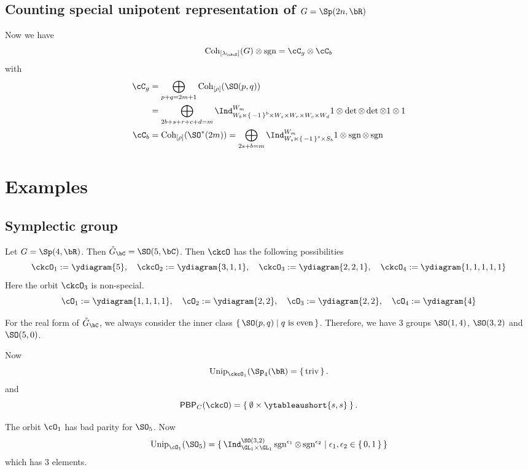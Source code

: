 \documentclass[12pt,a4paper]{amsart}
\let\ytb=\ytableaushort
\newcommand{\sgn}{\operatorname{sgn}}
\newcommand{\triv}{\operatorname{triv}}
\numberwithin{equation}{section}
\theoremstyle{remark}
\def\Unip{\mathrm{Unip}}
\def\ckG{\check{G}}
\def\lamck{\lambda_\ckcO}
\def\Cint#1{\Coh_{[#1]}}
\def\Coh{\mathrm{Coh}}
\begin{document}
\subsection{Counting special unipotent representation of $G = \Sp(2n,\bR)$}

Now we have 
\[
  \Cint{\lamck}(G) \otimes \sgn  = \cC_g\otimes \cC_b 
\]
with 
\[
  \begin{split}
 \cC_g &= \bigoplus_{p+q=2m+1}\Cint{\rho}(\SO(p,q))  \\
 &= 
 \bigoplus_{2b+s+r+c+d=m}\Ind_{W_b\ltimes \set{-1}^b\times W_s\times W_r\times W_c\times W_d}^{W_m} 1 \otimes \det \otimes \det \otimes 1 \otimes 1\\
 \cC_b &= \Cint{\rho}(\SO^*(2m)) = \bigoplus_{\substack{2s+b=m}}\Ind_{W_s\ltimes \set{-1}^s\times S_b}^{W_m} 1 \otimes\sgn\otimes \sgn   
  \end{split}
\]



\section{Examples}
\subsection{Symplectic group}
Let $G = \Sp(4,\bR)$. Then $\ckG_{\bC}= \SO(5,\bC)$.
Then $\ckcO$ has the following possibilities
\[
  \ckcO_{1}:= \ydiagram{5},\quad \ckcO_{2}:=\ydiagram{3,1,1}, \quad
  \ckcO_{3}:=\ydiagram{2,2,1}, \quad \ckcO_{4}:=\ydiagram{1,1,1,1,1}
\]
Here the orbit $\ckcO_{3}$ is non-special.
\[
  \cO_{1}:= \ydiagram{1,1,1,1},\quad \cO_{2}:=\ydiagram{2,2}, \quad
  \cO_{3}:=\ydiagram{2,2}, \quad \cO_{4}:=\ydiagram{4}
\]

For the real form of $\ckG_{\bC}$, we always consider the inner class
$\set{\SO(p,q)| q \text{ is even}}$.
Therefore, we have $3$ groups $\SO(1,4)$, $\SO(3,2)$ and $\SO(5,0)$.


Now
\[
  \Unip_{\ckcO_{1}}(\Sp_{4}(\bR) = \set{\triv}.
\]
and
\[
  \PBP_{C}(\ckcO) = \Set{\emptyset \times \ytb{s,s}}.
\]


The orbit $\cO_{1}$ has bad parity for $\SO_{5}$.
Now
\[
  \Unip_{\cO_{1}}(\SO_{5}) = \set{\Ind_{\GL_{1}\times \GL_{1}}^{\SO(3,2)} \sgn^{\epsilon_{1}}\otimes \sgn^{\epsilon_{2}}|
  \epsilon_{1},\epsilon_{2}\in \set{0,1}}
\]
which has $3$ elements.

\end{document}
